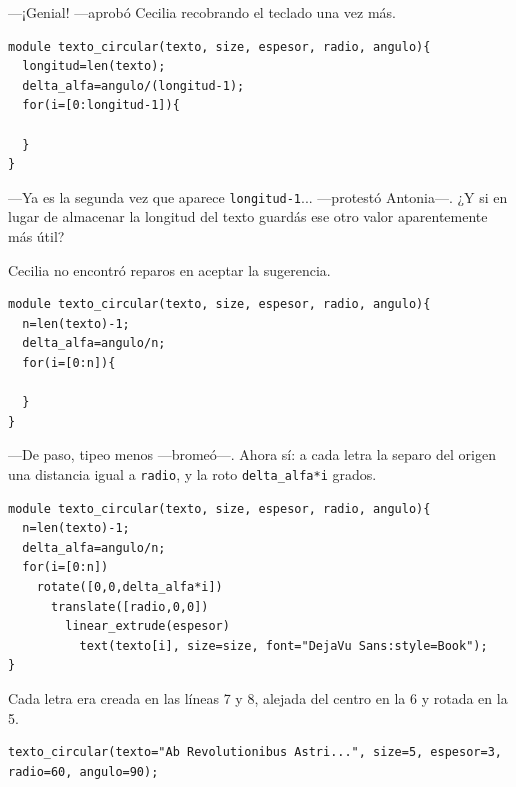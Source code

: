 ---¡Genial! ---aprobó Cecilia recobrando el teclado una vez más.

\begin{lstlisting}
module texto_circular(texto, size, espesor, radio, angulo){
  longitud=len(texto);
  delta_alfa=angulo/(longitud-1);
  for(i=[0:longitud-1]){
 
  }
}
\end{lstlisting}

---Ya es la segunda vez que aparece \lstinline!longitud-1!...
---pro\-tes\-tó Antonia---. ¿Y si en lugar de almacenar la longitud del
texto guardás ese otro valor aparentemente más útil?

Cecilia no encontró reparos en aceptar la sugerencia.

\begin{lstlisting}
module texto_circular(texto, size, espesor, radio, angulo){
  n=len(texto)-1;
  delta_alfa=angulo/n;
  for(i=[0:n]){

  }
}
\end{lstlisting}

---De paso, tipeo menos ---bromeó---. Ahora sí: a cada letra la separo
del origen una distancia igual a \lstinline!radio!, y la roto
\lstinline!delta_alfa*i! grados.

\begin{lstlisting}
module texto_circular(texto, size, espesor, radio, angulo){
  n=len(texto)-1;
  delta_alfa=angulo/n;
  for(i=[0:n])
    rotate([0,0,delta_alfa*i])
      translate([radio,0,0])
        linear_extrude(espesor)
          text(texto[i], size=size, font="DejaVu Sans:style=Book");
}

\end{lstlisting}

Cada letra era creada en las líneas 7 y 8, alejada del centro en la 6
y rotada en la 5.

\begin{lstlisting}[numbers=none]
texto_circular(texto="Ab Revolutionibus Astri...", size=5, espesor=3, radio=60, angulo=90);
\end{lstlisting}


